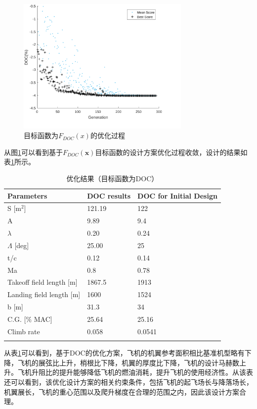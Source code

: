 \documentclass[12pt,a4paper]{report}
\begin{document}
\begin{figure}[ht!]
	\centering
	\includegraphics[width=0.75\textwidth]{./media4/image19.pdf}
	\caption{目标函数为$F_{DOC} \left( x \right) $的优化过程}
	\label{fig:g43PSO}
\end{figure}

从图\ref{fig:g43PSO}可以看到基于${{F}_{DOC}}(\textbf{x})$目标函数的设计方案优化过程收敛，设计的结果如表\ref{wing-results-doc}所示。

\begin{table}[ht!]
\centering
\caption{优化结果（目标函数为DOC）}
\begin{tabular}{|p{4.8cm}|p{2.3cm}|p{4.5cm}|}
\hhline{|===|}
Parameters	& DOC results &	 DOC for Initial Design \\ \hline
S [m$^2$]	& 121.19	& 122 \\ \hline
A	& 9.89	& 9.4 \\ \hline
$\lambda$	& 0.20	& 0.24 \\ \hline
$\Lambda$ [deg]	 &25.00	 & 25\\ \hline
t/c	 & 0.12	 & 0.14\\ \hline
Ma	& 0.8	& 0.78\\ \hline
Takeoff field length [m]	& 1867.5	& 1913\\ \hline
Landing field length [m]	& 1600	& 1524\\ \hline
b [m]	& 31.3	& 34\\ \hline 
C.G. [$\%$ MAC]	& 25.64	& 25.16\\ \hline
Climb rate	& 0.058	& 0.0541 \\ \hhline{|===|}
\hline
\end{tabular}
\label{wing-results-doc}
\end{table}

从表\ref{wing-results-doc}可以看到，基于DOC的优化方案，飞机的机翼参考面积相比基准机型略有下降，飞机的展弦比上升，梢根比下降，机翼的厚度比下降，飞机的设计马赫数上升。飞机升阻比的提升能够降低飞机的燃油消耗，提升飞机的使用经济性。从该表还可以看到，该优化设计方案的相关约束条件，包括飞机的起飞场长与降落场长，机翼展长，飞机的重心范围以及爬升梯度在合理的范围之内，因此该设计方案合理。
\end{document}

